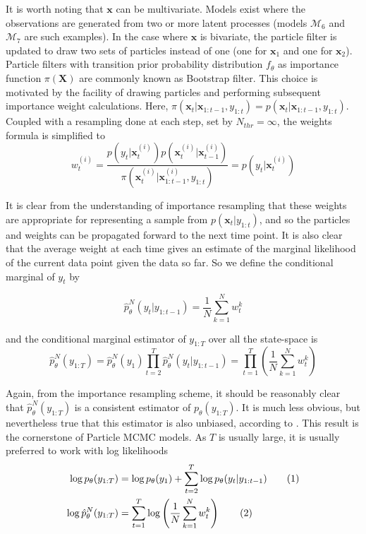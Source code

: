 \documentclass[11pt,a4,twosided,singlespacing,titlepagenumber=on]{scrreprt}
\numberwithin{equation}{chapter} %
\theoremstyle{remark}
\newcommand{\matr}[1]{\mathbf{#1}}
\newcommand\numberthis{\addtocounter{equation}{1}\tag{\theequation}}
\begin{document}
It is worth noting that $\matr{x}$ can be multivariate. Models exist where the observations are generated from two or more latent processes (models $\mathcal{M}_6$ and $\mathcal{M}_7$ are such examples). In the case where $\matr{x}$ is bivariate, the particle filter is updated to draw two sets of particles instead of one (one for $\matr{x}_1$ and one for $\matr{x}_2$). \\

Particle filters with transition prior probability distribution $f_\theta$ as importance function $\pi(\matr{X})$ are commonly known as Bootstrap filter. This choice is motivated by the facility of drawing particles and performing subsequent importance weight calculations. Here, $\pi(\matr{x}_t| \matr{x}_{1:t-1}, y_{1:t}) = p(\matr{x}_t |\matr{x}_{1:t-1}, y_{1:t})$. Coupled with a resampling done at each step, set by $N_{thr} = \infty$, the weights formula is simplified to
\begin{equation}
w_t^{(i)} = \frac{p(y_t|\matr{x}_t^{(i)})p(\matr{x}_t^{(i)}|\matr{x}^{(i)}_{t-1})}{\pi(\matr{x}_t^{(i)}|\matr{x}^{(i)}_{1:t-1},y_{1:t})}=  p(y_t|\matr{x}_t^{(i)})
\end{equation}

It is clear from the understanding of importance resampling that these weights are appropriate for representing a sample from $p(\matr{x}_t|y_{1:t})$, and so the particles and weights can be propagated forward to the next time point. It is also clear that the average weight at each time gives an estimate of the marginal likelihood of the current data point given the data so far. So we define the conditional marginal of $y_t$ by

\begin{equation}
 \hat{p}^N_{\theta}(y_t | y_{1:t-1}) = \frac{1}{N} \sum_{k=1}^N w_t^k
\end{equation}

and the conditional marginal estimator of $y_{1:T}$ over all the state-space is
\begin{equation}
 \hat{p}^N_\theta(y_{1:T}) = \hat{p}^N_\theta(y_1)\prod_{t=2}^T \hat{p}^N_\theta(y_t | y_{1:t-1}) = \prod_{t=1}^T \left( \frac{1}{N} \sum_{k=1}^N w_t^k \right)
\end{equation}

Again, from the importance resampling scheme, it should be reasonably clear that $\hat{p}^N_{\theta}(y_{1:T})$ is a consistent estimator of $p_{\theta}(y_{1:T})$. It is much less obvious, but nevertheless true that this estimator is also unbiased, according to \cite{delmoral2004}. This result is the cornerstone of Particle MCMC models. As $T$ is usually large, it is usually preferred to work with log likelihoods
\begin{align*}
\log p_{\theta}(y_{1:T}) &= \log p_\theta(y_1) + \sum_{t=2}^T \log p_\theta(y_t | y_{1:t-1}) \numberthis \\
\log \hat{p}^N_\theta(y_{1:T}) &= \sum_{t=1}^T \log \left(\frac{1}{N} \sum_{k=1}^N w_t^{k} \right) \numberthis
\end{align*}
\end{document}
